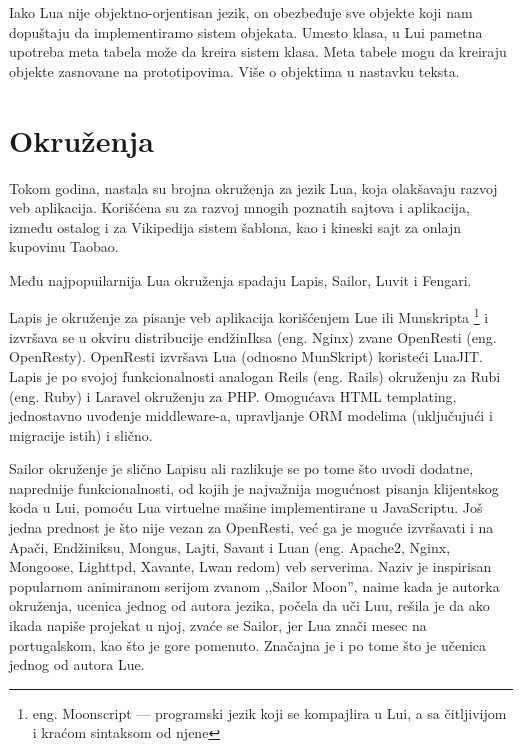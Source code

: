 \documentclass[a4paper]{article}
\begin{document}


Iako Lua nije objektno-orjentisan jezik, on obezbeđuje sve objekte koji nam dopuštaju da implementiramo sistem objekata. Umesto klasa, u Lui pametna upotreba meta tabela može da kreira sistem klasa. Meta tabele mogu da kreiraju objekte zasnovane na prototipovima. Više o objektima u nastavku teksta.


\section{Okruženja}
\label{sec:okruzenja}


Tokom godina, nastala su brojna okruženja za jezik Lua, koja olakšavaju razvoj veb aplikacija. Korišćena su za razvoj mnogih poznatih sajtova i aplikacija, između ostalog i za Vikipedija sistem šablona, kao i kineski sajt za onlajn kupovinu Taobao.

Među najpopuilarnija Lua okruženja spadaju Lapis, Sailor, Luvit i Fengari.

Lapis je okruženje za pisanje veb aplikacija korišćenjem Lue ili Munskripta \footnote{eng. Moonscript --- programski jezik koji se kompajlira u Lui, a sa čitljivijom i kraćom sintaksom od njene} i izvršava se u okviru distribucije endžinIksa (eng. Nginx) zvane OpenResti (eng. OpenResty). OpenResti izvršava Lua (odnosno MunSkript) koristeći LuaJIT. Lapis je po svojoj funkcionalnosti analogan Reils (eng. Rails) okruženju za Rubi (eng. Ruby) i Laravel okruženju za PHP. Omogućava HTML templating, jednostavno uvođenje middleware-a, upravljanje ORM modelima (uključujući i migracije istih) i slično. 

Sailor okruženje je slično Lapisu ali razlikuje se po tome što uvodi dodatne, naprednije funkcionalnosti, od kojih je najvažnija mogućnost pisanja klijentskog koda u Lui, pomoću Lua virtuelne mašine implementirane u JavaScriptu. Još jedna prednost je što nije vezan za OpenResti, već ga je moguće izvršavati i na Apači, Endžiniksu, Mongus, Lajti, Savant i Luan (eng. Apache2, Nginx, Mongoose, Lighttpd, Xavante, Lwan redom) veb serverima. Naziv je inspirisan popularnom animiranom serijom zvanom ,,Sailor Moon'', naime kada je autorka okruženja, ucenica jednog od autora jezika, počela da uči Luu, rešila je da ako ikada napiše projekat u njoj, zvaće se Sailor, jer Lua znači mesec na portugalskom, kao što je gore pomenuto. Značajna je i po tome što je učenica jednog od autora Lue\cite{frameworkSailor}. 
\end{document}
